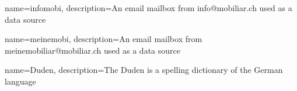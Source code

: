 {
    name=infomobi,
    description={An email mailbox from info@mobiliar.ch used as a data source}
}

{
    name=meinemobi,
    description={An email mailbox from meinemobiliar@mobiliar.ch used as a data source}
}

{
    name=Duden,
    description={The Duden is a spelling dictionary of the German language}
}





